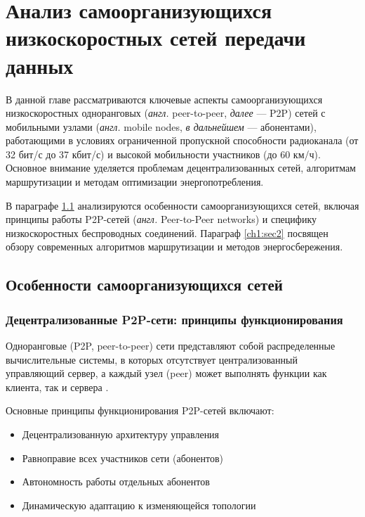 \chapter{Анализ самоорганизующихся низкоскоростных сетей передачи данных} \label{ch1}


В данной главе рассматриваются ключевые аспекты самоорганизующихся низкоскоростных одноранговых (\textit{англ.} peer-to-peer, \textit{далее} — P2P) сетей с 
мобильными узлами (\textit{англ.} mobile nodes, \textit{в дальнейшем} — абонентами), работающими в условиях ограниченной пропускной способности радиоканала 
(от 32 бит/с до 37 кбит/с) и высокой мобильности участников (до 60 км/ч). Основное внимание уделяется проблемам децентрализованных сетей, алгоритмам 
маршрутизации и методам оптимизации энергопотребления.

В параграфе \ref{ch1:sec1} анализируются особенности самоорганизующихся сетей, включая принципы работы P2P-сетей (\textit{англ.} Peer-to-Peer networks) и 
специфику низкоскоростных беспроводных соединений. Параграф \ref{ch1:sec2} посвящен обзору современных алгоритмов маршрутизации и методов энергосбережения.

\section{Особенности самоорганизующихся сетей} \label{ch1:sec1}

\subsection{Децентрализованные P2P-сети: принципы функционирования} \label{ch1:sec1:subsec1}

Одноранговые (P2P, peer-to-peer) сети представляют собой распределенные вычислительные системы, в которых отсутствует централизованный управляющий сервер, 
а каждый узел (peer) может выполнять функции как клиента, так и сервера \cite{tanenbaum2011computer}.

Основные принципы функционирования P2P-сетей включают:

\begin{itemize}
\item Децентрализованную архитектуру управления
\item Равноправие всех участников сети (абонентов)
\item Автономность работы отдельных абонентов
\item Динамическую адаптацию к изменяющейся топологии
\end{itemize}

